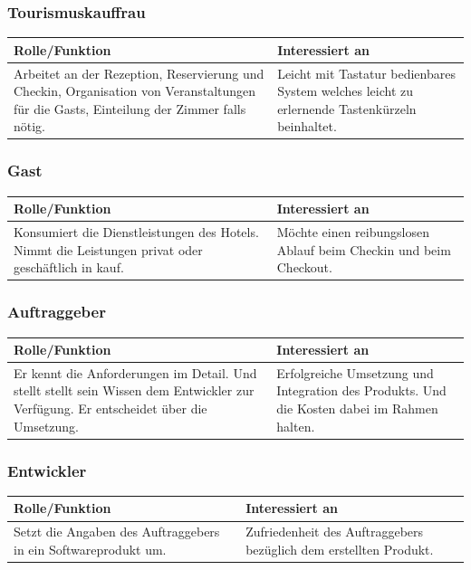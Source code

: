\documentclass[10pt,a4paper,titlepage]{article}
\begin{document}
\subsubsection{Tourismuskauffrau}
\begin{tabular}[t]{|p{5cm}|p{5cm}|}
    \hline
    \textbf{Rolle\slash{}Funktion} & \textbf{Interessiert an} \\
    \hline
Arbeitet an der \Gls{Rezeption}, \Gls{Reservierung} und \Gls{Checkin}, Organisation von Veranstaltungen für die \Glspl{Gast}, Einteilung der \Gls{Zimmer} falls nötig. &
	Leicht mit Tastatur bedienbares System welches leicht zu erlernende Tastenkürzeln beinhaltet. \\
    \hline
\end{tabular}
\subsubsection{\Gls{Gast}}
\begin{tabular}[t]{|p{5cm}|p{5cm}|}
    \hline
    \textbf{Rolle\slash{}Funktion} & \textbf{Interessiert an} \\
    \hline
	Konsumiert die Dienstleistungen des Hotels. Nimmt die Leistungen privat oder geschäftlich in kauf. &
	Möchte einen reibungslosen Ablauf beim \Gls{Checkin} und beim \Gls{Checkout}. \\
    \hline
\end{tabular}
\subsubsection{Auftraggeber}
\begin{tabular}[t]{|p{5cm}|p{5cm}|}
    \hline
    \textbf{Rolle\slash{}Funktion} & \textbf{Interessiert an} \\
    \hline
	Er kennt die Anforderungen im Detail. Und stellt stellt sein Wissen dem Entwickler zur Verfügung. Er entscheidet über die Umsetzung. &
	Erfolgreiche Umsetzung und Integration des Produkts. Und die Kosten dabei im Rahmen halten. \\
    \hline
\end{tabular}
\subsubsection{Entwickler}
\begin{tabular}[t]{|p{5cm}|p{5cm}|}
    \hline
    \textbf{Rolle\slash{}Funktion} & \textbf{Interessiert an} \\
    \hline
Setzt die Angaben des Auftraggebers in ein Softwareprodukt um. &
	Zufriedenheit des Auftraggebers bezüglich dem erstellten Produkt.\\
    \hline
\end{tabular}
\end{document}
